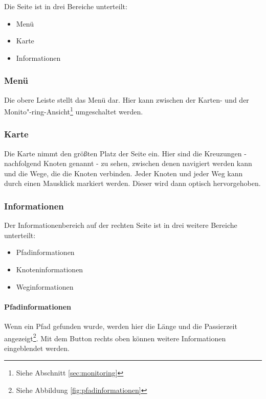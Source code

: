 Die Seite ist in drei Bereiche unterteilt:

\begin{itemize}
  \item Menü
  \item Karte
  \item Informationen
\end{itemize}

\subsubsection{Menü}
\label{sec:menue}

Die obere Leiste stellt das Menü dar.
Hier kann zwischen der Karten- und der Monito"-ring-Ansicht\footnote{Siehe Abschnitt \ref{sec:monitoring}} umgeschaltet werden.

\subsubsection{Karte}
\label{sec:karte}

Die Karte nimmt den größten Platz der Seite ein.
Hier sind die Kreuzungen - nachfolgend Knoten genannt - zu sehen, zwischen denen navigiert werden kann und die Wege, die die Knoten verbinden.
Jeder Knoten und jeder Weg kann durch einen Mausklick markiert werden.
Dieser wird dann optisch hervorgehoben.

\subsubsection{Informationen}
\label{sec:informationen}

Der Informationenbereich auf der rechten Seite ist in drei weitere Bereiche unterteilt:

\begin{itemize}
  \item Pfadinformationen
  \item Knoteninformationen
  \item Weginformationen
\end{itemize}

\paragraph{Pfadinformationen}
\label{sec:pfadinformationen}

Wenn ein Pfad gefunden wurde, werden hier die Länge und die Passierzeit angezeigt\footnote{Siehe Abbildung \ref{fig:pfadinformationen}}.
Mit dem Button rechts oben können weitere Informationen eingeblendet werden.

